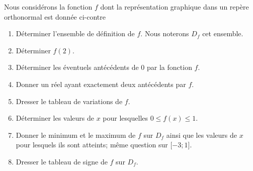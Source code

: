 
\begin{exercice}\label{exosmath-0547}

    \begin{center}
   
    \end{center}

Nous considérons la fonction \( f\) dont la représentation graphique dans un repère orthonormal est donnée ci-contre 
\begin{enumerate}
    \item
        Déterminer l'ensemble de définition de \( f\). Nous noterons \( D_f\) cet ensemble.
    \item
        Déterminer \( f(2)\).
    \item
        Déterminer les éventuels antécédents de \( 0\) par la fonction \( f\).
    \item
        Donner un réel ayant exactement deux antécédents par \( f\).
    \item
        Dresser le tableau de variations de \( f\).
    \item
        Déterminer les valeurs de \( x\) pour lesquelles \( 0\leq f(x)\leq 1\).
    \item
        Donner le minimum et le maximum de \( f\) sur \( D_f\) ainsi que les valeurs de \( x\) pour lesquels ils sont atteints; même question sur \( \mathopen[ -3 ; 1 \mathclose]\).
    \item
        Dresser le tableau de signe de \( f\) sur \( D_f\).
\end{enumerate}

\end{exercice}
